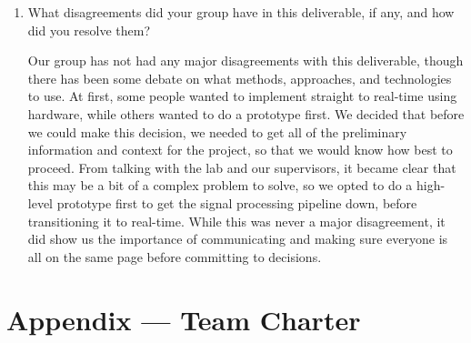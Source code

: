 \documentclass{article}
\begin{document}
\begin{enumerate}
    However, one of the biggest disadvantages of CI/CD to our project is that
    it can't test anything on our hardware. Because much of our system will rely
    on the Vivid Q ultrasound, our hardware, and the PowerLab 8/30 unit, we will
    need to test those separately. This means passing CI doesn't guarantee that
    the system works on the hardware, and it could give us a false sense of
    confidence if we're not careful. Another downside is that tests are also
    only as good as the signals we test against, which may not include the noise
    and artifacts we'll see from the real ultrasound, though we do aim to use old
    pre-recorded data to be more consistent with what we'd expect to see in
    real-time. The Continuous Deployment part of CI/CD also doesn't really apply to
    our project since we won't be deploying much software live, though it is
    useful for making our documents available to the lab and our supervisors for
    review. Overall, we do agree that CI/CD is worth implementing, though we
    also need to implement other forms of functional testing to ensure our
    hardware works as intended.

    \item What disagreements did your group have in this deliverable, if any,
    and how did you resolve them?

    Our group has not had any major disagreements with this deliverable, though
    there has been some debate on what methods, approaches, and technologies to
    use. At first, some people wanted to implement straight to real-time using
    hardware, while others wanted to do a prototype first. We decided that
    before we could make this decision, we needed to get all of the preliminary
    information and context for the project, so that we would know how best to
    proceed. From talking with the lab and our supervisors, it became clear that
    this may be a bit of a complex problem to solve, so we opted to do a
    high-level prototype first to get the signal processing pipeline down,
    before transitioning it to real-time. While this was never a major
    disagreement, it did show us the importance of communicating and making sure
    everyone is all on the same page before committing to decisions.
\end{enumerate}

\newpage{}

\section*{Appendix --- Team Charter}
\end{document}
